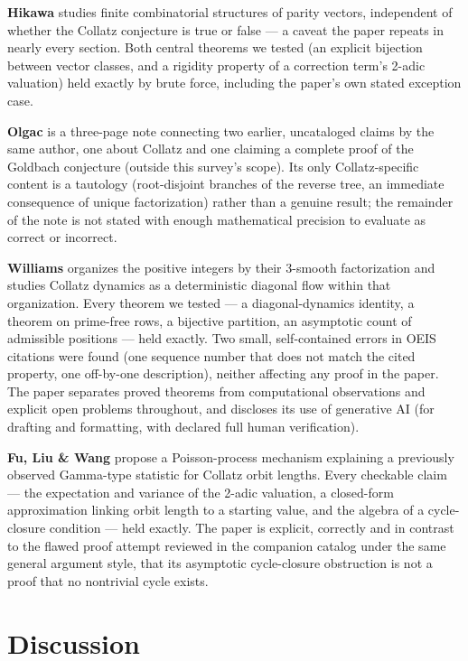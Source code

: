 \documentclass[11pt]{article}
\begin{document}
\textbf{Hikawa} \cite{Hikawa2026} studies finite combinatorial
structures of parity vectors, independent of whether the Collatz
conjecture is true or false --- a caveat the paper repeats in nearly
every section. Both central theorems we tested (an explicit bijection
between vector classes, and a rigidity property of a correction term's
2-adic valuation) held exactly by brute force, including the paper's
own stated exception case.

\textbf{Olgac} \cite{Olgac2026} is a three-page note connecting two
earlier, uncataloged claims by the same author, one about Collatz and
one claiming a complete proof of the Goldbach conjecture (outside this
survey's scope). Its only Collatz-specific content is a tautology
(root-disjoint branches of the reverse tree, an immediate consequence
of unique factorization) rather than a genuine result; the remainder of
the note is not stated with enough mathematical precision to evaluate
as correct or incorrect.

\textbf{Williams} \cite{Williams2026} organizes the positive integers by
their 3-smooth factorization and studies Collatz dynamics as a
deterministic diagonal flow within that organization. Every theorem we
tested --- a diagonal-dynamics identity, a theorem on prime-free rows,
a bijective partition, an asymptotic count of admissible positions ---
held exactly. Two small, self-contained errors in OEIS citations were
found (one sequence number that does not match the cited property, one
off-by-one description), neither affecting any proof in the paper. The
paper separates proved theorems from computational observations and
explicit open problems throughout, and discloses its use of generative
AI (for drafting and formatting, with declared full human
verification).

\textbf{Fu, Liu \& Wang} \cite{FuLiuWang2026} propose a Poisson-process
mechanism explaining a previously observed Gamma-type statistic for
Collatz orbit lengths. Every checkable claim --- the expectation and
variance of the 2-adic valuation, a closed-form approximation linking
orbit length to a starting value, and the algebra of a cycle-closure
condition --- held exactly. The paper is explicit, correctly and in
contrast to the flawed proof attempt reviewed in the companion catalog
under the same general argument style, that its asymptotic
cycle-closure obstruction is not a proof that no nontrivial cycle
exists.

\section{Discussion}
\label{sec:discussion}
\end{document}
